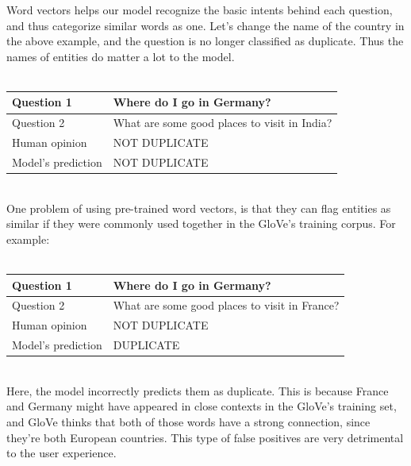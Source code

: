 \documentclass{article}
\begin{document}
Word vectors helps our model recognize the basic intents behind each question, and thus categorize similar words as one. Let's change the name of the country in the above example, and the question is no longer classified as duplicate. Thus the names of entities do matter a lot to the model.
\\\\
\begin{tabular}{|l|l|}
\hline
Question 1 & Where do I go in Germany? \\ \hline
Question 2 & What are some good places to visit in India? \\ \hline
Human opinion & NOT DUPLICATE \\ \hline
Model's prediction & NOT DUPLICATE \\ \hline
\end{tabular}\\

One problem of using pre-trained word vectors, is that they can flag entities as similar if they were commonly used together in the GloVe's training corpus. For example:
\\\\
\begin{tabular}{|l|l|}
\hline
Question 1 & Where do I go in Germany? \\ \hline
Question 2 & What are some good places to visit in France? \\ \hline
Human opinion & NOT DUPLICATE \\ \hline
Model's prediction & DUPLICATE \\ \hline
\end{tabular}\\

Here, the model incorrectly predicts them as duplicate. This is because France and Germany might have appeared in close contexts in the GloVe's training set, and GloVe thinks that both of those words have a strong connection, since they're both European countries. This type of false positives are very detrimental to the user experience.
\end{document}
